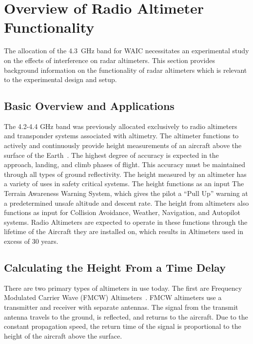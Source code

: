 \section{Overview of Radio Altimeter Functionality}
The allocation of the 4.3~GHz band for WAIC necessitates an experimental study on the effects of interference on radar altimeters. This section provides background information on the functionality of radar altimeters which is relevant to the experimental design and setup.

\subsection{Basic Overview and Applications}
The 4.2-4.4 GHz band was previously allocated exclusively to radio altimeters and transponder systems associated with altimetry. The altimeter functions to actively and continuously provide height measurements of an aircraft above the surface of the Earth~\cite{noauthor_operational_2014}. The highest degree of accuracy is expected in the approach, landing, and climb phases of flight. This accuracy must be maintained through all types of ground reflectivity. The height measured by an altimeter has a variety of uses in safety critical systems. The height functions as an input The Terrain Awareness Warning System, which gives the pilot a  ``Pull Up'' warning at a predetermined unsafe altitude and descent rate. The height from altimeters also functions as input for Collision Avoidance, Weather, Navigation, and Autopilot systems. Radio Altimeters are expected to operate in these functions through the lifetime of the Aircraft they are installed on, which results in Altimeters used in excess of 30 years.

\subsection{Calculating the Height From a Time Delay}
There are two primary types of altimeters in use today. The first are Frequency Modulated Carrier Wave (FMCW) Altimeters~\cite{noauthor_operational_2014}. FMCW altimeters use a transmitter and receiver with separate antennas. The signal from the transmit antenna travels to the ground, is reflected, and returns to the aircraft. Due to the constant propagation speed, the return time of the signal is proportional to the height of the aircraft above the surface. 


